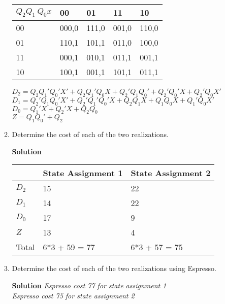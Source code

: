 \begin{enumerate}
\begin{enumerate}
\begin{onlysolution}
{                        \begin{tabular}{l|l|l|l|l}
                            $Q_2 Q_1 \ Q_0 x$  & 00 & 01  & 11 & 10 \\ \hline
                            00  & 000,0 & 111,0 & 001,0 & 110,0  \\ \hline
                            01  & 110,1 & 101,1 & 011,0 & 100,0  \\ \hline
                            11  & 000,1 & 010,1 & 011,1 & 001,1  \\ \hline
                            10  & 100,1 & 001,1 & 101,1 & 011,1  \\
                        \end{tabular}

                        $D_2 = Q_2Q_1'Q_0'X' + Q_2Q_1'Q_0X + Q_2'Q_1Q_0' + Q_2'Q_0'X + Q_2'Q_0X'$ \\
                        $D_1 = Q_2'Q_1Q_0'X' + Q_2'Q_1'Q_0'X + Q_2Q_1X+Q_1Q_0X + Q_1'Q_0X'$\\
                        $D_0 = Q_1'X + Q_2'X + Q_2Q_0$                    \\
                        $Z   = Q_1Q_0' + Q_2$                        \\

                    }
                \end{onlysolution}

            \item Determine the cost of each of the two realizations.

                \begin{onlysolution}  \textbf{Solution} \itshape{
                        \begin{tabular}{l|l|l}
                            & State Assignment 1    & State Assignment 2 \\ \hline
                            $D_2$    &     15        &    22    \\ \hline
                            $D_1$    &    14        &    22    \\ \hline
                            $D_0$    &    17        &    9    \\ \hline
                            $Z$    &    13        &    4    \\ \hline
                            Total    & 6*3 + 59 = 77         & 6*3 + 57 = 75    \\
                        \end{tabular}
                    }
                \end{onlysolution}
            \item Determine the cost of each of the two realizations using Espresso.
                \begin{onlysolution}  \textbf{Solution} \itshape{
                        Espresso cost 77 for state assignment  1 \\
                        Espresso cost 75 for state assignment  2
                    }
                \end{onlysolution}
        \end{enumerate}


\end{enumerate}

